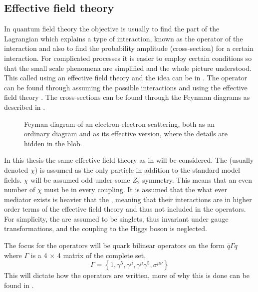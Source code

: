 \subsection{Effective field theory}
In quantum field theory the objective is usually to find the part of the Lagrangian which explains a type of interaction, known as the operator of the interaction and also to find the probability amplitude (cross-section) for a certain interaction. For complicated processes it is easier to employ certain conditions so that the small scale phenomena are simplified and the whole picture understood. This called using an effective field theory and the idea can be in . The operator can be found through assuming the possible interactions and using the effective field theory \citep{Zee:2003}. The cross-sections can be found through the Feynman diagrams as described in . 
 \begin{figure}[!ht]
    \hfill
    \caption{Feyman diagram of an electron-electron scattering, both as an ordinary diagram and as its effective version, where the details are hidden in the blob.}
    \label{fig:feymanc}
  \end{figure}

In this thesis the same effective field theory as in \citep{82.116010,Goodman:2010} will be considered. The \abbrWIMP (usually denoted $\chi$) is assumed as the only particle in addition to the standard model fields. $\chi$ will be assumed odd under some $Z_2$ symmetry. This means that an even number of $\chi$ must be in every coupling. It is assumed that the what ever mediator exists is heavier that the \abbrWIMPS, meaning that their interactions are in higher order terms of the effective field theory and thus not included in the operators. For simplicity, the \abbrWIMPS are assumed to be \abbrSM singlets, thus invariant under \abbrSM gauge transformations, and the coupling to the Higgs boson is neglected.

The focus for the operators will be quark bilinear operators on the form $\bar{q}\Gamma q$ where $\Gamma$ is a 4 $\times$ 4 matrix of the complete set, 
\begin{equation}
\Gamma = \left\lbrace 1,\gamma ^5,\gamma ^\mu,\gamma ^\mu \gamma ^5, \sigma ^{\mu \nu} \right\rbrace
\end{equation}
This will dictate how the operators are written, more of why this is done can be found in \citep{82.116010,Goodman:2010,Zee:2003}.

